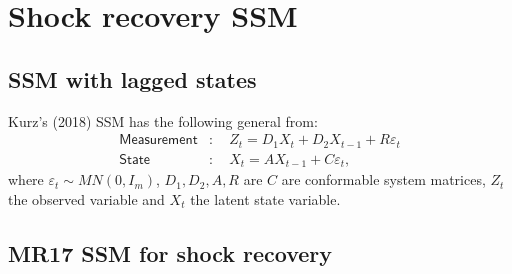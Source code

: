 \documentclass[a4paper,12pt]{article}
\newcommand{\bsq}{\begin{subequations}}\newcommand{\esq}{\end{subequations}}
\begin{document}
\section{Shock recovery SSM}

\subsection{SSM with lagged states}

Kurz's (2018) SSM has the following general from:\bsq\label{SSM}%
\begin{align}
\mathsf{Measurement}& :\quad Z_{t}=D_{1}X_{t}+D_{2}X_{t-1}+R\varepsilon _{t}
\label{ssm1} \\
\mathsf{State}& :\quad X_{t}=AX_{t-1}+C\varepsilon _{t},  \label{ssm2}
\end{align}%
\esq where $\varepsilon _{t}\sim MN(0,I_{m})$, $D_{1},D_{2},A,R$ are $C$ are
conformable system matrices, $Z_{t}$ the observed variable and $X_{t}$ the
latent state variable.

\subsection{MR17 SSM for shock recovery}
\end{document}
